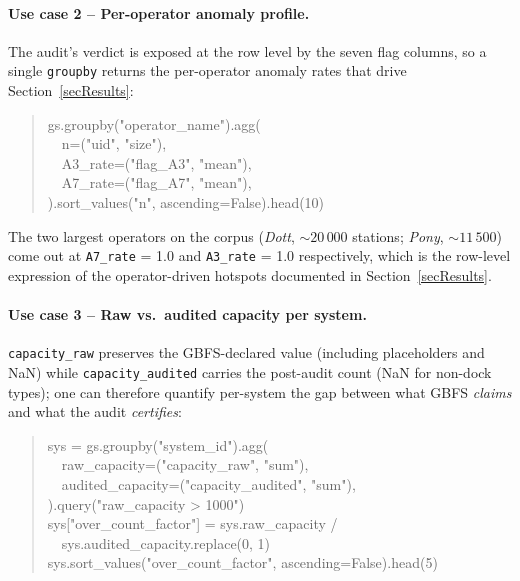 \documentclass[11pt,a4paper]{article}
\begin{document}
\paragraph{Use case 2 -- Per-operator anomaly profile.}
The audit's verdict is exposed at the row level by the seven flag
columns, so a single \texttt{groupby} returns the per-operator
anomaly rates that drive Section~\ref{secResults}:
\begin{quote}\small\ttfamily
gs.groupby("operator\_name").agg(\\
\ \ n=("uid", "size"),\\
\ \ A3\_rate=("flag\_A3", "mean"),\\
\ \ A7\_rate=("flag\_A7", "mean"),\\
).sort\_values("n", ascending=False).head(10)
\end{quote}
The two largest operators on the corpus (\emph{Dott},
$\sim 20\,000$ stations; \emph{Pony}, $\sim 11\,500$) come out at
\texttt{A7\_rate} = 1.0 and \texttt{A3\_rate} = 1.0 respectively,
which is the row-level expression of the operator-driven hotspots
documented in Section~\ref{secResults}.

\paragraph{Use case 3 -- Raw vs.\ audited capacity per system.}
\texttt{capacity\_raw} preserves the GBFS-declared value (including
placeholders and NaN) while \texttt{capacity\_audited} carries the
post-audit count (NaN for non-dock types); one can therefore
quantify per-system the gap between what GBFS \emph{claims} and
what the audit \emph{certifies}:
\begin{quote}\small\ttfamily
sys = gs.groupby("system\_id").agg(\\
\ \ raw\_capacity=("capacity\_raw", "sum"),\\
\ \ audited\_capacity=("capacity\_audited", "sum"),\\
).query("raw\_capacity > 1000")\\
sys["over\_count\_factor"] = sys.raw\_capacity / \\
\ \ sys.audited\_capacity.replace(0, 1)\\
sys.sort\_values("over\_count\_factor", ascending=False).head(5)
\end{quote}
\end{document}
